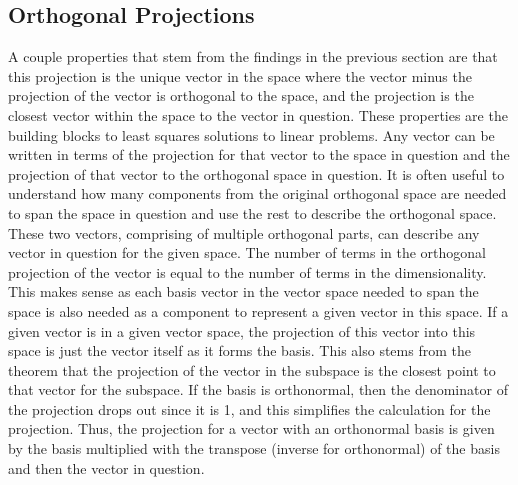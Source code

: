 \documentclass[12pt]{article}
\begin{document}
\subsection{Orthogonal Projections}
A couple properties that stem from the findings in the previous section are that this projection is the unique vector in the space where the vector minus the projection of the vector is 
orthogonal to the space, and the projection is the closest vector within the space to the vector in question. These properties are the building blocks to least squares solutions to 
linear problems. Any vector can be written in terms of the projection for that vector to the space in question and the projection of that vector to the orthogonal space in question. 
It is often useful to understand how many components from the original orthogonal space are needed to span the space in question and use the rest to describe the orthogonal space. 
These two vectors, comprising of multiple orthogonal parts, can describe any vector in question for the given space. The number of terms in the orthogonal projection of the vector 
is equal to the number of terms in the dimensionality. This makes sense as each basis vector in the vector space needed to span the space is also needed as a component to represent 
a given vector in this space. If a given vector is in a given vector space, the projection of this vector into this space is just the vector itself as it forms the basis. This also 
stems from the theorem that the projection of the vector in the subspace is the closest point to that vector for the subspace. If the basis is orthonormal, then the denominator 
of the projection drops out since it is 1, and this simplifies the calculation for the projection. Thus, the projection for a vector with an orthonormal basis is given by the basis 
multiplied with the transpose (inverse for orthonormal) of the basis and then the vector in question. 
\end{document}
